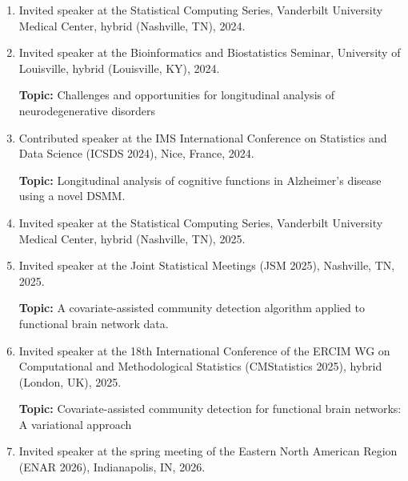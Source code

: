 \documentclass[12pt,letterpaper]{article}
\newenvironment{cventry}{\begin{minipage}[t]{\linewidth}}{\end{minipage}}
\begin{document}
\begin{enumerate}
\begin{cventry}
		\textbf{Topic:} Analysis of functional brain networks with the
		presence of erroneous links.
		\par\end{cventry}
		\item\begin{cventry} Invited speaker at the Statistical Computing Series, 
		Vanderbilt University Medical Center, hybrid (Nashville, 
		TN), 2024.
		\par\end{cventry}
		\item\begin{cventry} Invited speaker at the Bioinformatics and 
		Biostatistics Seminar, University of Louisville, hybrid 
		(Louisville, KY), 2024.
		
		\textbf{Topic:} Challenges and opportunities for longitudinal
		analysis of neurodegenerative disorders
		\par\end{cventry}
		\item\begin{cventry} Contributed speaker at the IMS International 
		Conference on Statistics and Data Science (ICSDS 2024), 
		Nice, France, 2024.
		
		\textbf{Topic:} Longitudinal analysis of cognitive functions 
		in Alzheimer's disease using a novel DSMM.
		\par\end{cventry}
		\item\begin{cventry} Invited speaker at the Statistical Computing Series, 
		Vanderbilt University Medical Center, hybrid (Nashville, 
		TN), 2025.
		\par\end{cventry}
		\item\begin{cventry} Invited speaker at the Joint Statistical Meetings (JSM 
		2025), Nashville, TN, 2025.	
		
		\textbf{Topic:} A covariate-assisted community detection 
		algorithm applied to functional brain network data.
		\par\end{cventry}
		\item\begin{cventry} Invited speaker at the 18th International Conference 
		of the ERCIM WG on Computational and Methodological 
		Statistics (CMStatistics 2025), hybrid (London, UK), 
		2025.
		
		\textbf{Topic:} Covariate-assisted community detection for
		functional brain networks: A variational approach
		\par\end{cventry}
		\item\begin{cventry} Invited speaker at the spring meeting of the Eastern 
		North American Region (ENAR 2026), Indianapolis, IN, 2026.	
		

\end{cventry}
\end{enumerate}
\end{document}
